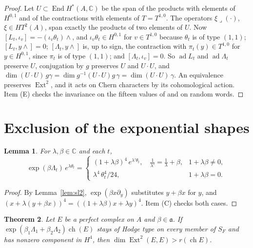 \documentclass[11pt]{amsart}
\newtheorem{theorem}{Theorem}[section]
\newtheorem{lemma}[theorem]{Lemma}
\theoremstyle{definition}
\theoremstyle{remark}
\newcommand{\CC}{\mathbb{C}}
\newcommand{\fa}{\mathfrak{a}}
\newcommand{\ch}{\operatorname{ch}}
\newcommand{\Ext}{\operatorname{Ext}}
\newcommand{\End}{\operatorname{End}}
\newcommand{\lrc}{\lrcorner}
\begin{document}
\begin{proof}
Let $U\subset\End H^{*}(A,\CC)$ be the span of the products with elements of
$H^{0,1}$ and of the contractions with elements of $T=T^{1,0}$. The operators
$\xi\lrc(\cdot)$, $\xi\in HT^{2}(A)$, span exactly the products of two
elements of $U$. Now $[L_{t},\iota_{v}]=-(\iota_{v}\theta_{t})\wedge$, and
$\iota_{v}\theta_{t}\in H^{0,1}$ for $v\in T^{1,0}$ because $\theta_{t}$ is of
type $(1,1)$; $[L_{t},y\wedge]=0$; $[\Lambda_{t},y\wedge]$ is, up to sign, the
contraction with $\pi_{t}(y)\in T^{1,0}$ for $y\in H^{0,1}$, since $\pi_{t}$ is
of type $(1,1)$; and $[\Lambda_{t},\iota_{v}]=0$. So $\operatorname{ad}L_{t}$
and $\operatorname{ad}\Lambda_{t}$ preserve $U$, conjugation by $g$ preserves
$U$ and $U\cdot U$, and $\dim(U\cdot U)\,g\gamma=\dim g^{-1}(U\cdot U)g\,
\gamma=\dim(U\cdot U)\,\gamma$. An equivalence preserves $\Ext^{2}$, and it
acts on Chern characters by its cohomological action. Item (E) checks the
invariance on the fifteen values of \cite[Theorem~19.22]{BMB} and on random
words.
\end{proof}

\section{Exclusion of the exponential shapes}\label{sec:main}

\begin{lemma}\label{lem:cusp}
For $\lambda,\beta\in\CC$ and each $t$,
\[
  \exp(\beta\Lambda_{t})\,e^{\lambda\theta_{t}}=
  \begin{cases}
    (1+\lambda\beta)^{4}\,e^{\lambda'\theta_{t}},\quad
    \frac{1}{\lambda'}=\frac{1}{\lambda}+\beta, & 1+\lambda\beta\neq0,\\[2pt]
    \lambda^{4}\,\theta_{t}^{4}/24, & 1+\lambda\beta=0 .
  \end{cases}
\]
\end{lemma}

\begin{proof}
By Lemma~\ref{lem:sl2}, $\exp(\beta x\partial_{y})$ substitutes $y+\beta x$
for $y$, and $(x+\lambda(y+\beta x))^{4}=((1+\lambda\beta)x+\lambda y)^{4}$.
Item (C) checks both cases.
\end{proof}

\begin{theorem}\label{thm:exclusion}
Let $E$ be a perfect complex on $A$ and $\beta\in\fa$. If
$\exp(\beta_{1}\Lambda_{1}+\beta_{2}\Lambda_{2})\ch(E)$ stays of Hodge type on
every member of $S_{F}$ and has nonzero component in $H^{4}$, then
$\dim\Ext^{2}(E,E)>r(\ch E)$.
\end{theorem}
\end{document}
